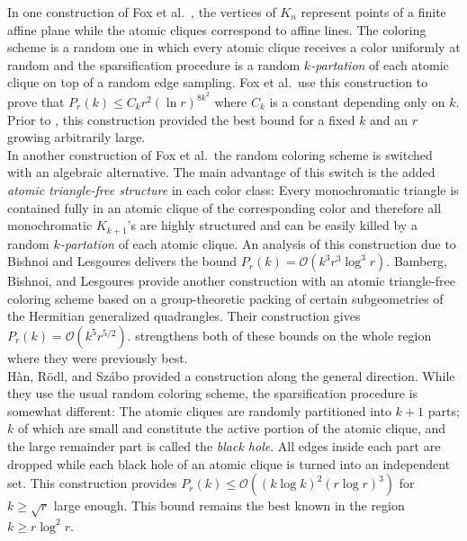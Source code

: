 \documentclass[12pt]{article}
\theoremstyle{definition}
\begin{document}
	In one construction of Fox et al.\ \cite{fox2016minimum}, the vertices of $K_n$ represent points of a finite affine plane while the atomic cliques correspond to affine lines. The coloring scheme is a random one in which every atomic clique receives a color uniformly at random and the  sparsification procedure is a random $k$\textit{-partation} of each atomic clique on top of a random edge sampling. Fox et al.\ use this construction to prove that $P_r(k)\leq C_kr^2(\ln r)^{8k^2}$ where $C_k$ is a constant depending only on $k$. Prior to , this construction provided the best bound for a fixed $k$ and an $r$ growing arbitrarily large.\\
	
	In another construction of Fox et al.\, the random coloring scheme is switched with an algebraic alternative. The main advantage of this switch is the added \textit{atomic triangle-free structure} in each color class: Every monochromatic triangle is contained fully in an atomic clique of the corresponding color and therefore all monochromatic $K_{k+1}$'s are highly structured and can be easily killed by a random $k$\textit{-partation} of each atomic clique. An analysis of this construction due to Bishnoi and Lesgoures \cite{bishnoi2022new} delivers the bound $P_r(k)= \mathcal{O}(k^3r^3\log^3 r)$. Bamberg, Bishnoi, and Lesgoures provide another construction with an atomic triangle-free coloring scheme based on a group-theoretic packing of certain subgeometries of the Hermitian generalized quadrangles. Their construction gives $P_r(k) = \mathcal{O}(k^5 r^{5/2})$.  strengthens both of these bounds on the whole region where they were previously best.\\
	
	
	Hàn, Rödl, and Szábo \cite{han} provided a construction along the general direction. While they use the usual random coloring scheme, the sparsification procedure is somewhat different: The atomic cliques are randomly partitioned into $k+1$ parts; $k$ of which are small and constitute the active portion of the  atomic clique, and the large remainder part is called the \emph{black hole}. All edges inside each part are dropped while each black hole of an atomic clique is turned into an independent set. This construction provides $P_r(k)\leq \mathcal{O}((k\log k)^2(r\log r)^3 )$ for $k \geq \sqrt{r}$ large enough. This bound remains the best known in the region $k \geq r \log^2 r$. \\
	
\end{document}
